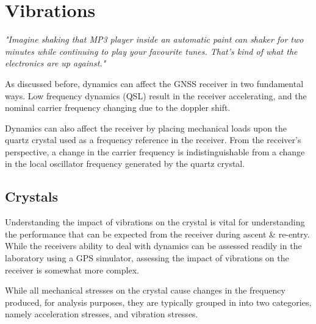\section{Vibrations}

\begin{comment}
"Vibration is not just a rocket issue, though. All electronic hardware is tested for its ability to handle shock and vibration. An MP3 player, for example, has to be tested for its ability to handle the vibrations from someone walking or jogging while holding it, placing it on a counter top, or accidentally dropping it on the floor. However, compared to the workout that Ares I-X’s avionics receive, your MP3 player has got it easy. Imagine shaking that MP3 player inside an automatic paint can shaker for two minutes while continuing to play your favourite tunes. That’s kind of what the electronics of the I-X are up against."
\end{comment}

\emph{"Imagine shaking that MP3 player inside an automatic paint can shaker for two minutes while continuing to play your favourite tunes. That's kind of what the electronics are up against."} \cite{MITRocketVibrations}

As discussed before, dynamics can affect the \ac{GNSS} receiver in two fundamental ways. Low frequency dynamics (\ac{QSL}) result in the receiver accelerating, and the nominal carrier frequency changing due to the doppler shift. 

Dynamics can also affect the receiver by placing mechanical loads upon the quartz crystal used as a frequency reference in the receiver. From the receiver's perspective, a change in the carrier frequency is indistinguishable from a change in the local oscillator frequency generated by the quartz crystal\cite{Kaplan}. 

\subsection{Crystals}
Understanding the impact of vibrations on the crystal is vital for understanding the performance that can be expected from the receiver during ascent \& re-entry. While the receivers ability to deal with dynamics can be assessed readily in the laboratory using a GPS simulator, assessing the impact of vibrations on the receiver is somewhat more complex.

While all mechanical stresses on the crystal cause changes in the frequency produced, for analysis purposes, they are typically grouped in into two categories, namely acceleration stresses, and vibration stresses. 

